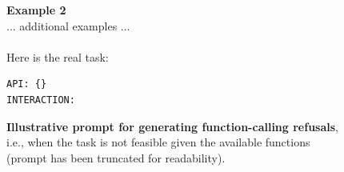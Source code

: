 \documentclass[table]{ai2style/ai2}
\begin{document}
{{\begin{figure}[h!]
\begin{prompt}{}
{\bf Example 2} \\

    ... additional examples ... \\\\

Here is the real task:

\begin{lstlisting}[basicstyle=\ttfamily\footnotesize,breaklines=true]
API: {}
INTERACTION:
\end{lstlisting}

\end{prompt}
\vspace{-1em}
\caption{\textbf{Illustrative prompt for generating function-calling refusals}, i.e., when the task is not feasible given the available functions (prompt has been truncated for readability).}
\label{fc-refusals-prompt}
\end{figure}

}}
\end{document}
